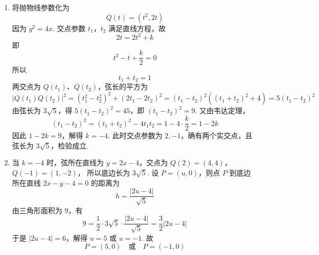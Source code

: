 \begin{solution}
\begin{enumerate}
\item 将抛物线参数化为
\[
Q(t)=(t^2,2t)
\]
因为 \(y^2=4x\). 交点参数 \(t_1\)，\(t_2\) 满足直线方程，故
\[
2t=2t^2+k
\]
即
\[
t^2-t+\frac{k}{2}=0
\]
所以
\[
t_1+t_2=1
\]
两交点为 \(Q(t_1)\)、\(Q(t_2)\)，弦长的平方为
\[
\left|Q(t_1)Q(t_2)\right|^2=\left(t_1^2-t_2^2\right)^2+\left(2t_1-2t_2\right)^2=\left(t_1-t_2\right)^2\left(\left(t_1+t_2\right)^2+4\right)=5\left(t_1-t_2\right)^2
\]
由弦长为 \(3\sqrt5\)，得 \(5(t_1-t_2)^2=45\)，即 \((t_1-t_2)^2=9\). 又由韦达定理，
\[
(t_1-t_2)^2=(t_1+t_2)^2-4t_1t_2=1-4\cdot\frac{k}{2}=1-2k
\]
因此 \(1-2k=9\)，解得 \(k=-4\). 此时交点参数为 \(2,-1\)，确有两个实交点，且弦长为 \(3\sqrt5\)，检验成立.
\item 当 \(k=-4\) 时，弦所在直线为 \(y=2x-4\)，交点为
\(Q(2)=(4,4)\)，\(Q(-1)=(1,-2)\)，
所以底边长为 \(3\sqrt5\). 设 \(P=(u,0)\)，则点 \(P\) 到底边所在直线 \(2x-y-4=0\) 的距离为
\[
h=\frac{|2u-4|}{\sqrt5}
\]
由三角形面积为 \(9\)，有
\[
9=\frac12\cdot3\sqrt5\cdot\frac{|2u-4|}{\sqrt5}=\frac32|2u-4|
\]
于是 \(|2u-4|=6\)，解得 \(u=5\) 或 \(u=-1\). 故
\[
P=(5,0)\quad\text{或}\quad P=(-1,0)
\]
\end{enumerate}
\end{solution}
